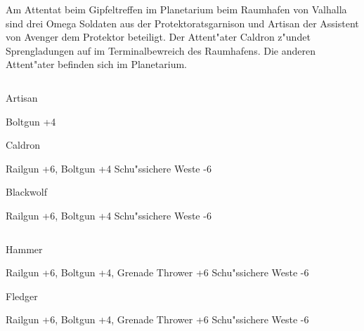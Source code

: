 
Am Attentat beim Gipfeltreffen im Planetarium beim Raumhafen von Valhalla sind drei Omega Soldaten aus der Protektoratsgarnison und Artisan der Assistent von Avenger dem Protektor beteiligt. Der Attent"ater Caldron z"undet Sprengladungen auf im Terminalbewreich des Raumhafens. Die anderen Attent"ater befinden sich im Planetarium.

\begin{column}[l]{0.45}
    \begin{nscsheet}[h]{Artisan}
        \nscstats[ATT=5,AGG=5,EMP=8,KNO=8,HP=12]
        \nscruler
        \begin{nscinventory}
            \nscitem[Waffen] Boltgun +4
        \end{nscinventory}
    \end{nscsheet}

    \begin{nscsheet}[h]{Caldron}
        \nscstats[ATT=8,AGG=8,EMP=2,KNO=4,HP=12]
        \nscruler
        \begin{nscinventory}
            \nscitem[Waffen] Railgun +6, Boltgun +4
            \nscitem[R"ustung] Schu"ssichere Weste -6           
        \end{nscinventory}
    \end{nscsheet}

    \begin{nscsheet}[h]{Blackwolf}
        \nscstats[ATT=8,AGG=8,EMP=1,KNO=2,HP=12]
        \nscruler
        \begin{nscinventory}
            \nscitem[Waffen] Railgun +6, Boltgun +4
            \nscitem[R"ustung] Schu"ssichere Weste -6          
        \end{nscinventory}
    \end{nscsheet}    
\end{column}
\begin{column}[r]{0.45}
    \begin{nscsheet}[h]{Hammer}
        \nscstats[ATT=8,AGG=8,EMP=1,KNO=2,HP=12]
        \nscruler
        \begin{nscinventory}
            \nscitem[Waffen] Railgun +6, Boltgun +4, Grenade Thrower +6
            \nscitem[R"ustung] Schu"ssichere Weste -6          
        \end{nscinventory}
    \end{nscsheet}
    
    \begin{nscsheet}[h]{Fledger}
        \nscstats[ATT=8,AGG=8,EMP=1,KNO=2,HP=12]
        \nscruler
        \begin{nscinventory}
            \nscitem[Waffen] Railgun +6, Boltgun +4, Grenade Thrower +6
            \nscitem[R"ustung] Schu"ssichere Weste -6          
        \end{nscinventory}
    \end{nscsheet}    
\end{column}

